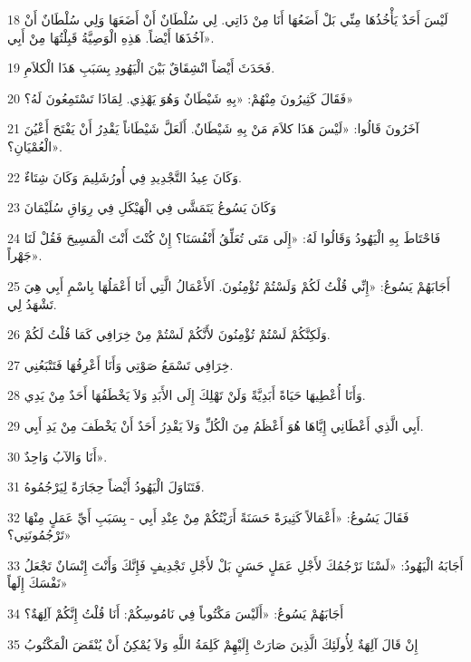 \par 18 لَيْسَ أَحَدٌ يَأْخُذُهَا مِنِّي بَلْ أَضَعُهَا أَنَا مِنْ ذَاتِي. لِي سُلْطَانٌ أَنْ أَضَعَهَا وَلِي سُلْطَانٌ أَنْ آخُذَهَا أَيْضاً. هَذِهِ الْوَصِيَّةُ قَبِلْتُهَا مِنْ أَبِي».
\par 19 فَحَدَثَ أَيْضاً انْشِقَاقٌ بَيْنَ الْيَهُودِ بِسَبَبِ هَذَا الْكلاَمِ.
\par 20 فَقَالَ كَثِيرُونَ مِنْهُمْ: «بِهِ شَيْطَانٌ وَهُوَ يَهْذِي. لِمَاذَا تَسْتَمِعُونَ لَهُ؟»
\par 21 آخَرُونَ قَالُوا: «لَيْسَ هَذَا كلاَمَ مَنْ بِهِ شَيْطَانٌ. أَلَعَلَّ شَيْطَاناً يَقْدِرُ أَنْ يَفْتَحَ أَعْيُنَ الْعُمْيَانِ؟».
\par 22 وَكَانَ عِيدُ التَّجْدِيدِ فِي أُورُشَلِيمَ وَكَانَ شِتَاءٌ.
\par 23 وَكَانَ يَسُوعُ يَتَمَشَّى فِي الْهَيْكَلِ فِي رِوَاقِ سُلَيْمَانَ
\par 24 فَاحْتَاطَ بِهِ الْيَهُودُ وَقَالُوا لَهُ: «إِلَى مَتَى تُعَلِّقُ أَنْفُسَنَا؟ إِنْ كُنْتَ أَنْتَ الْمَسِيحَ فَقُلْ لَنَا جَهْراً».
\par 25 أَجَابَهُمْ يَسُوعُ: «إِنِّي قُلْتُ لَكُمْ وَلَسْتُمْ تُؤْمِنُونَ. اَلأَعْمَالُ الَّتِي أَنَا أَعْمَلُهَا بِاسْمِ أَبِي هِيَ تَشْهَدُ لِي.
\par 26 وَلَكِنَّكُمْ لَسْتُمْ تُؤْمِنُونَ لأَنَّكُمْ لَسْتُمْ مِنْ خِرَافِي كَمَا قُلْتُ لَكُمْ.
\par 27 خِرَافِي تَسْمَعُ صَوْتِي وَأَنَا أَعْرِفُهَا فَتَتْبَعُنِي.
\par 28 وَأَنَا أُعْطِيهَا حَيَاةً أَبَدِيَّةً وَلَنْ تَهْلِكَ إِلَى الأَبَدِ وَلاَ يَخْطَفُهَا أَحَدٌ مِنْ يَدِي.
\par 29 أَبِي الَّذِي أَعْطَانِي إِيَّاهَا هُوَ أَعْظَمُ مِنَ الْكُلِّ وَلاَ يَقْدِرُ أَحَدٌ أَنْ يَخْطَفَ مِنْ يَدِ أَبِي.
\par 30 أَنَا وَالآبُ وَاحِدٌ».
\par 31 فَتَنَاوَلَ الْيَهُودُ أَيْضاً حِجَارَةً لِيَرْجُمُوهُ.
\par 32 فَقَالَ يَسُوعُ: «أَعْمَالاً كَثِيرَةً حَسَنَةً أَرَيْتُكُمْ مِنْ عِنْدِ أَبِي - بِسَبَبِ أَيِّ عَمَلٍ مِنْهَا تَرْجُمُونَنِي؟»
\par 33 أَجَابَهُ الْيَهُودُ: «لَسْنَا نَرْجُمُكَ لأَجْلِ عَمَلٍ حَسَنٍ بَلْ لأَجْلِ تَجْدِيفٍ فَإِنَّكَ وَأَنْتَ إِنْسَانٌ تَجْعَلُ نَفْسَكَ إِلَهاً»
\par 34 أَجَابَهُمْ يَسُوعُ: «أَلَيْسَ مَكْتُوباً فِي نَامُوسِكُمْ: أَنَا قُلْتُ إِنَّكُمْ آلِهَةٌ؟
\par 35 إِنْ قَالَ آلِهَةٌ لِأُولَئِكَ الَّذِينَ صَارَتْ إِلَيْهِمْ كَلِمَةُ اللَّهِ وَلاَ يُمْكِنُ أَنْ يُنْقَضَ الْمَكْتُوبُ
